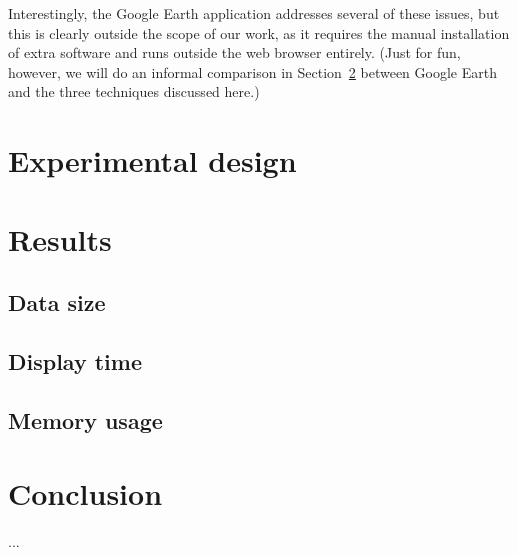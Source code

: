 \documentclass[acmtocl,acmnow]{acmtrans2m}
\begin{document}
Interestingly, the Google Earth application addresses several of these
issues, but this is clearly outside the scope of our work, as it
requires the manual installation of extra software and runs outside the
web browser entirely. (Just for fun, however, we will do an informal
comparison in Section~\ref{sec-results} between Google Earth and the
three techniques discussed here.)


\section{Experimental design}
\label{sec-experiment}


\section{Results}
\label{sec-results}


\subsection{Data size}


\subsection{Display time}


\subsection{Memory usage}


\section{Conclusion}








\begin{received}
...
\end{received}
\end{document}
